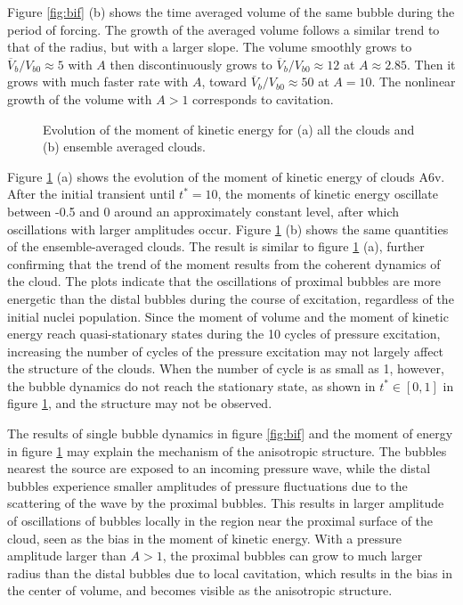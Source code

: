 \documentclass{jfm}
\begin{document}
Figure \ref{fig:bif} (b) shows the time averaged volume of the same bubble during the period of forcing.
The growth of the averaged volume follows a similar trend to that of the radius, but with a larger slope.
The volume smoothly grows to $\overline{V}_b/V_{b0}\approx5$ with $A$ then discontinuously grows to $\overline{V}_b/V_{b0}\approx12$ at $A\approx2.85$.
Then it grows with much faster rate with $A$, toward $\overline{V}_b/V_{b0}\approx50$ at $A=10$.
The nonlinear growth of the volume with $A>1$ corresponds to cavitation.

\begin{figure}
  \center
  \caption{Evolution of the moment of kinetic energy for (a) all the clouds and (b) ensemble averaged clouds.}
   \label{fig:xk_cent}
\end{figure}
Figure \ref{fig:xk_cent} (a) shows the evolution of the moment of kinetic energy of clouds A6v. After the initial transient until $t^*=10$, the moments of kinetic energy oscillate between -0.5 and 0 around an approximately constant level, after which oscillations with larger amplitudes occur. Figure \ref{fig:xk_cent} (b) shows the same quantities of the ensemble-averaged clouds. The result is similar to figure \ref{fig:xk_cent} (a), further confirming that the trend of the moment results from the coherent dynamics of the cloud.
The plots indicate that the oscillations of proximal bubbles are more energetic than the distal bubbles during the course of excitation, regardless of the initial nuclei population.
Since the moment of volume and the moment of kinetic energy reach quasi-stationary states during the 10 cycles of pressure excitation, increasing the number of cycles of the pressure excitation may not largely affect the structure of the clouds.
When the number of cycle is as small as 1, however, the bubble dynamics do not reach the stationary state, as shown in $t^*\in[0,1]$ in figure \ref{fig:xk_cent}, and the structure may not be observed.

The results of single bubble dynamics in figure \ref{fig:bif} and the moment of energy in figure \ref{fig:xk_cent} may explain the mechanism of the anisotropic structure.
The bubbles nearest the source are exposed to an incoming pressure wave, while the distal bubbles experience smaller amplitudes of pressure fluctuations due to the scattering of the wave by the proximal bubbles. This results in larger amplitude of oscillations of bubbles locally in the region near the proximal surface of the cloud, seen as the bias in the moment of kinetic energy.
With a pressure amplitude larger than $A>1$, the proximal bubbles can grow to much larger radius than the distal bubbles due to local cavitation, which results in the bias in the center of volume, and becomes visible as the anisotropic structure.
\end{document}
